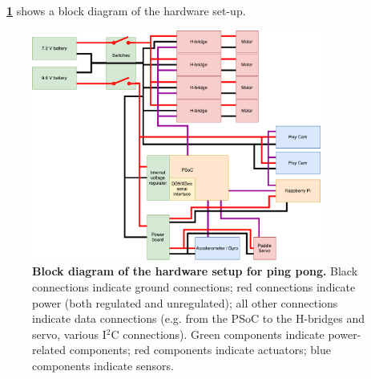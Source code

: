 \documentclass[letterpaper, 11pt]{article}
\newcommand*{\figref}[1]{\textbf{\figurename~\ref{#1}}}
\newcommand{\iic}{I$^2$C\xspace}
\begin{document}
\figref{fig:blockdiagram} shows a block diagram of the hardware set-up.
\begin{figure}[ht]
    \centering
    \includegraphics[width=0.85\textwidth]{images/BlockDiagram.pdf}
    \caption{\textbf{Block diagram of the hardware setup for ping pong.} Black connections indicate ground connections; red connections indicate power (both regulated and unregulated); all other connections indicate data connections (e.g. from the PSoC to the H-bridges and servo, various \iic connections). Green components indicate power-related components; red components indicate actuators; blue components indicate sensors.}
    \label{fig:blockdiagram}
\end{figure}
\end{document}
